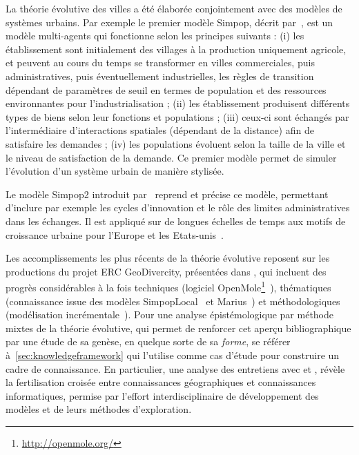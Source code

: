 La théorie évolutive des villes a été élaborée conjointement avec des modèles de systèmes urbains. Par exemple le premier modèle Simpop, décrit par~\cite{sanders1997simpop}, est un modèle multi-agents qui fonctionne selon les principes suivants : (i) les établissement sont initialement des villages à la production uniquement agricole, et peuvent au cours du temps se transformer en villes commerciales, puis administratives, puis éventuellement industrielles, les règles de transition dépendant de paramètres de seuil en termes de population et des ressources environnantes pour l'industrialisation ; (ii) les établissement produisent différents types de biens selon leur fonctions et populations ; (iii) ceux-ci sont échangés par l'intermédiaire d'interactions spatiales (dépendant de la distance) afin de satisfaire les demandes ; (iv) les populations évoluent selon la taille de la ville et le niveau de satisfaction de la demande. Ce premier modèle permet de simuler l'évolution d'un système urbain de manière stylisée.

Le modèle Simpop2 introduit par~\cite{bretagnolle2006theory} reprend et précise ce modèle, permettant d'inclure par exemple les cycles d'innovation et le rôle des limites administratives dans les échanges. Il est appliqué sur de longues échelles de temps aux motifs de croissance urbaine pour l'Europe et les Etats-unis~\cite{doi:10.1177/0042098010377366}.


Les accomplissements les plus récents de la théorie évolutive reposent sur les productions du projet ERC GeoDivercity, présentées dans \cite{pumain2017urban}, qui incluent des progrès considérables à la fois techniques (logiciel OpenMole\footnote{\url{http://openmole.org/}}~\cite{reuillon2013openmole}), thématiques (connaissance issue des modèles SimpopLocal~\cite{schmitt2014modelisation} et Marius~\cite{cottineau2014evolution}) et méthodologiques (modélisation incrémentale~\cite{cottineau2015incremental}). Pour une analyse épistémologique par méthode mixtes de la théorie évolutive, qui permet de renforcer cet aperçu bibliographique par une étude de sa genèse, en quelque sorte de sa \emph{forme}, se référer à~\ref{sec:knowledgeframework} qui l'utilise comme cas d'étude pour construire un cadre de connaissance. En particulier, une analyse des entretiens avec  et , révèle la fertilisation croisée entre connaissances géographiques et connaissances informatiques, permise par l'effort interdisciplinaire de développement des modèles et de leurs méthodes d'exploration.



